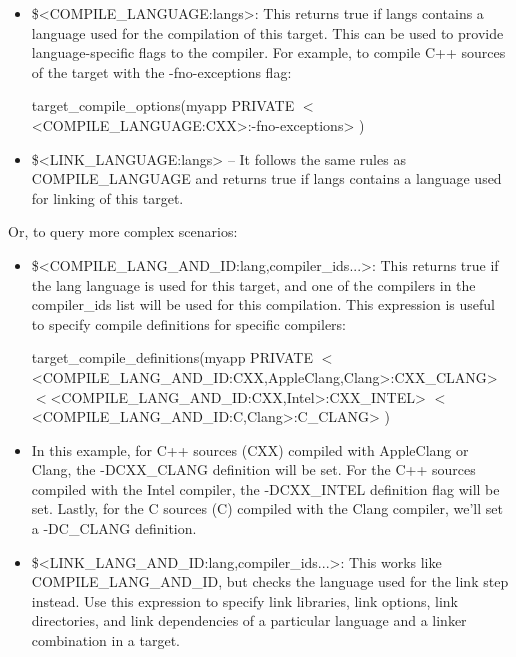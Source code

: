 \begin{itemize}
\item
\$<COMPILE\_LANGUAGE:langs>: This returns true if langs contains a language used for the compilation of this target. This can be used to provide language-specific flags to the compiler. For example, to compile C++ sources of the target with the -fno-exceptions flag:

\begin{cmake}
target_compile_options(myapp
    PRIVATE $<$<COMPILE_LANGUAGE:CXX>:-fno-exceptions>
)
\end{cmake}

\item
\$<LINK\_LANGUAGE:langs> – It follows the same rules as COMPILE\_LANGUAGE and returns true if langs contains a language used for linking of this target.
\end{itemize}

Or, to query more complex scenarios:

\begin{itemize}
\item
\$<COMPILE\_LANG\_AND\_ID:lang,compiler\_ids...>: This returns true if the lang language is used for this target, and one of the compilers in the compiler\_ids list will be used for this compilation. This expression is useful to specify compile definitions for specific compilers:

\begin{cmake}
target_compile_definitions(myapp PRIVATE
    $<$<COMPILE_LANG_AND_ID:CXX,AppleClang,Clang>:CXX_CLANG>
    $<$<COMPILE_LANG_AND_ID:CXX,Intel>:CXX_INTEL>
    $<$<COMPILE_LANG_AND_ID:C,Clang>:C_CLANG>
)
\end{cmake}

\item
In this example, for C++ sources (CXX) compiled with AppleClang or Clang, the -DCXX\_CLANG definition will be set. For the C++ sources compiled with the Intel compiler, the -DCXX\_INTEL definition flag will be set. Lastly, for the C sources (C) compiled with the Clang compiler, we’ll set a -DC\_CLANG definition.

\item
\$<LINK\_LANG\_AND\_ID:lang,compiler\_ids...>: This works like COMPILE\_LANG\_AND\_ID, but checks the language used for the link step instead. Use this expression to specify link libraries, link options, link directories, and link dependencies of a particular language and a linker combination in a target.
\end{itemize}

